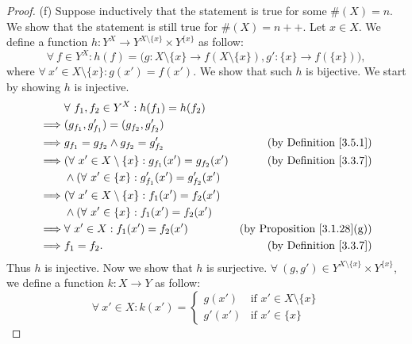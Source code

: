 \begin{proof}{(f)}
    Suppose inductively that the statement is true for some \(\#(X) = n\).
    We show that the statement is still true for \(\#(X) = n++\).
    Let \(x \in X\).
    We define a function \(h : Y^X \to Y^{X \setminus \{x\}} \times Y^{\{x\}}\) as follow:
    \[
        \forall\ f \in Y^X : h(f) = \bigg(g : X \setminus \{x\} \to f(X \setminus \{x\}), g' : \{x\} \to f(\{x\})\bigg),
    \]
    where \(\forall\ x' \in X \setminus \{x\} : g(x') = f(x')\).
    We show that such \(h\) is bijective.
    We start by showing \(h\) is injective.
    \begin{align*}
                 & \forall\ f_1, f_2 \in Y^X : h(f_1) = h(f_2)                                                              \\
        \implies & (g_{f_1}, g_{f_1}') = (g_{f_2}, g_{f_2}')                                                                \\
        \implies & g_{f_1} = g_{f_2} \land g_{f_2} = g_{f_2}'                     & \text{(by Definition \ref{3.5.1})}      \\
        \implies & (\forall\ x' \in X \setminus \{x\} : g_{f_1}(x') = g_{f_2}(x') & \text{(by Definition \ref{3.3.7})}      \\
                 & \land (\forall\ x' \in \{x\} : g_{f_1}'(x') = g_{f_2}'(x')                                               \\
        \implies & (\forall\ x' \in X \setminus \{x\} : f_1(x') = f_2(x')                                                   \\
                 & \land (\forall\ x' \in \{x\} : f_1(x') = f_2(x')                                                         \\
        \implies & \forall\ x' \in X : f_1(x') = f_2(x')                          & \text{(by Proposition \ref{3.1.28}(g))} \\
        \implies & f_1 = f_2.                                                     & \text{(by Definition \ref{3.3.7})}
    \end{align*}
    Thus \(h\) is injective.
    Now we show that \(h\) is surjective.
    \(\forall\ (g, g') \in Y^{X \setminus \{x\}} \times Y^{\{x\}}\), we define a function \(k : X \to Y\) as follow:
    \[
        \forall\ x' \in X : k(x') = \begin{cases}
            g(x')  & \text{if } x' \in X \setminus \{x\} \\
            g'(x') & \text{if } x' \in \{x\}
        \end{cases}
\]
\end{proof}
